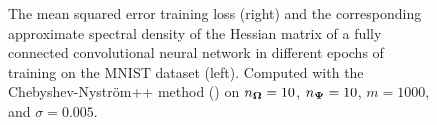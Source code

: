 \begin{figure}
    \begin{minipage}[c]{.49\linewidth}
        \centering
        
    \end{minipage}\hfill%
    \begin{minipage}[c]{.49\linewidth}
        \centering
        
    \end{minipage}
    \caption{The mean squared error training loss (right) and the corresponding approximate spectral density of the Hessian matrix of a fully connected convolutional neural network in different epochs of training on the MNIST dataset (left). Computed with the Chebyshev-Nyström++ method () on $n_{\boldsymbol{\Omega}} = 10$, $n_{\boldsymbol{\Psi}} = 10$, $m = 1000$, and $\sigma = 0.005$.}
    \label{fig:hessian-density}
\end{figure}
